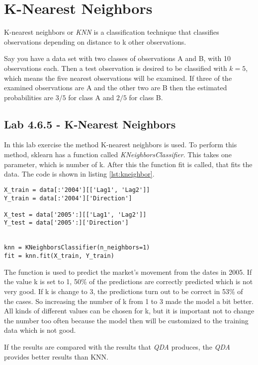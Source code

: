 \section{K-Nearest Neighbors}
K-nearest neighbors or \emph{KNN} is a classification technique that classifies observations depending on distance to k other observations. 

Say you have a  data set with two classes of observations A and B, with 10 observations each. Then a test observation is desired to be classified with $k=5$, which means the five nearest observations will be examined. If three of the examined observations are A and the other two are B then the estimated probabilities are $3/5$ for class A and $2/5$ for class B. 

\subsection{Lab 4.6.5 - K-Nearest Neighbors}

In this lab exercise the method K-nearest neighbors is used. To perform this method, sklearn has a function called \emph{KNeighborsClassifier}. This takes one parameter, which is number of k. After this the function fit is called, that fits the data.
The code is shown in listing \ref{lst:kneighbor}.

\begin{lstlisting}[caption={Python KNN function, where k is set to 1}, label=lst:kneighbor, mathescape=true]
X_train = data[:'2004'][['Lag1', 'Lag2']]
Y_train = data[:'2004']['Direction']

X_test = data['2005':][['Lag1', 'Lag2']]
Y_test = data['2005':]['Direction']


knn = KNeighborsClassifier(n_neighbors=1)
fit = knn.fit(X_train, Y_train)
\end{lstlisting}

The function is used to predict the market's movement from the dates in 2005. If the value k is set to 1, 50\% of the predictions are correctly predicted which is not very good.
If k is change to 3, the predictions turn out to be correct in 53\% of the cases. So increasing the number of k from 1 to 3 made the model a bit better. All kinds of different values can be chosen for k, but it is important not to change the number too often because the model then will be customized to the training data which is not good.

If the results are compared with the results that \emph{QDA} produces, the \emph{QDA} provides better results than KNN.